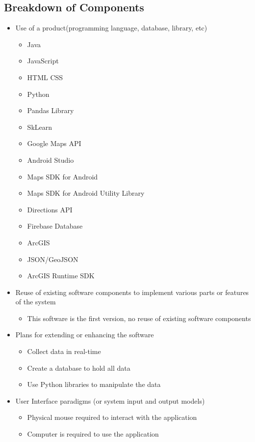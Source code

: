 \documentclass[a4paper,12pt]{article}
\begin{document}
\subsection{Breakdown of Components}
\begin{itemize}
  \item Use of a product(programming language, database, library, etc)
    \begin{itemize}
    \item Java
    \item JavaScript
    \item HTML CSS
    \item Python
    \item Pandas Library
    \item SkLearn
    \item Google Maps API
    \item Android Studio
    \item Maps SDK for Android
    \item Maps SDK for Android Utility Library
    \item Directions API
    \item Firebase Database
    \item ArcGIS
    \item JSON/GeoJSON
    \item ArcGIS Runtime SDK
  \end{itemize}
\end{itemize}
\begin{itemize}
  \item Reuse of existing software components to implement various parts or features of the system
    \begin{itemize}
    \item This software is the first version, no reuse of existing software components
  \end{itemize}
\end{itemize}
\begin{itemize}
  \item Plans for extending or enhancing the software
    \begin{itemize}
    \item Collect data in real-time
    \item Create a database to hold all data
    \item Use Python libraries to manipulate the data
  \end{itemize}
\end{itemize}
\begin{itemize}
  \item User Interface paradigms (or system input and output models)
    \begin{itemize}
    \item Physical mouse required to interact with the application
    \item Computer is required to use the application
  \end{itemize}
\end{itemize}
\end{document}
